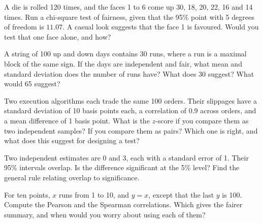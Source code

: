 \begin{question}\label{iq:iv1:statistics:22}
A die is rolled 120 times, and the faces 1 to 6 come up 30, 18, 20, 22, 16 and 14 times. Run a chi-square test of fairness, given that the 95\% point with 5 degrees of freedom is $11.07$. A casual look suggests that the face 1 is favoured. Would you test that one face alone, and how?
\end{question}

\begin{question}\label{iq:iv1:statistics:23}
A string of 100 up and down days contains 30 runs, where a run is a maximal block of the same sign. If the days are independent and fair, what mean and standard deviation does the number of runs have? What does 30 suggest? What would 65 suggest?
\end{question}

\begin{question}\label{iq:iv1:statistics:24}
Two execution algorithms each trade the same 100 orders. Their slippages have a standard deviation of 10 basis points each, a correlation of $0.9$ across orders, and a mean difference of 1 basis point. What is the $z$-score if you compare them as two independent samples? If you compare them as pairs? Which one is right, and what does this suggest for designing a test?
\end{question}

\begin{question}\label{iq:iv1:statistics:25}
Two independent estimates are 0 and 3, each with a standard error of 1. Their 95\% intervals overlap. Is the difference significant at the 5\% level? Find the general rule relating overlap to significance.
\end{question}

\begin{question}\label{iq:iv1:statistics:26}
For ten points, $x$ runs from 1 to 10, and $y = x$, except that the last $y$ is 100. Compute the Pearson and the Spearman correlations. Which gives the fairer summary, and when would you worry about using each of them?
\end{question}

